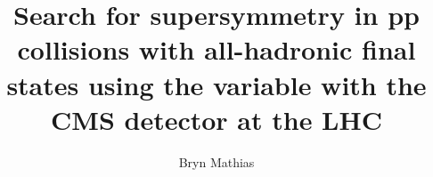 \documentclass[hyper,AGBdraft,nobind,oneside,noroman]{hepthesis}%
\begin{document}
\linenumbers %
\title{Search for supersymmetry in pp collisions with all-hadronic final states using the \alt variable with the CMS detector at the LHC}
\author{Bryn Mathias}
   
\begin{frontmatter} 


\end{frontmatter}
  
\begin{mainmatter}





% 




\end{mainmatter}
    


\begin{appendix}
  
  
  
  
  

\end{appendix}


\begin{backmatter}



\end{backmatter}
\end{document}
